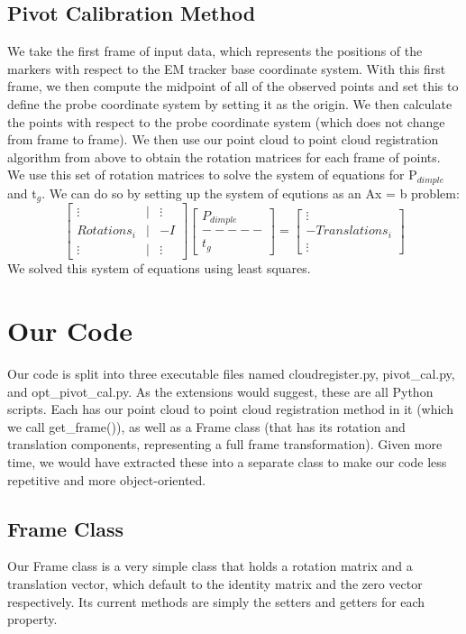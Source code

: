 \documentclass[a4paper]{article}
\begin{document}
\subsection{Pivot Calibration Method}
We take the first frame of input data, which represents the positions of the markers with respect to the EM tracker base coordinate system. With this first frame, we then compute the midpoint of all of the observed points and set this to define the probe coordinate system by setting it as the origin. We then calculate the points with respect to the probe coordinate system (which does not change from frame to frame). We then use our point cloud to point cloud registration algorithm from above to obtain the rotation matrices for each frame of points.
We use this set of rotation matrices to solve the system of equations for P$_{dimple}$ and t$_g$. We can do so by setting up the 
system of equtions as an Ax = b problem:
\[
\begin{bmatrix}
    \vdots & | & \vdots \\
    Rotations_i & | & -I \\
    \vdots & | & \vdots
\end{bmatrix}
\begin{bmatrix}
    P_{dimple} \\
    ----- \\
    t_g
\end{bmatrix}
 = 
\begin{bmatrix}
    \vdots \\
    -Translations_i \\
    \vdots
\end{bmatrix}
\]
We solved this system of equations using least squares.

\section{Our Code}
Our code is split into three executable files named cloudregister.py, pivot\_cal.py, and opt\_pivot\_cal.py. As the extensions would suggest, these are all Python scripts. Each has our point cloud to point cloud registration method in it (which we call get\_frame()), as well as a Frame class (that has its rotation and translation components, representing a full frame transformation). Given more time, we would have extracted these into a separate class to make our code less repetitive and more object-oriented.

\subsection{Frame Class}
Our Frame class is a very simple class that holds a rotation matrix and a translation vector, which default to the identity matrix and the zero vector respectively. Its current methods are simply the setters and getters for each property.
\end{document}

